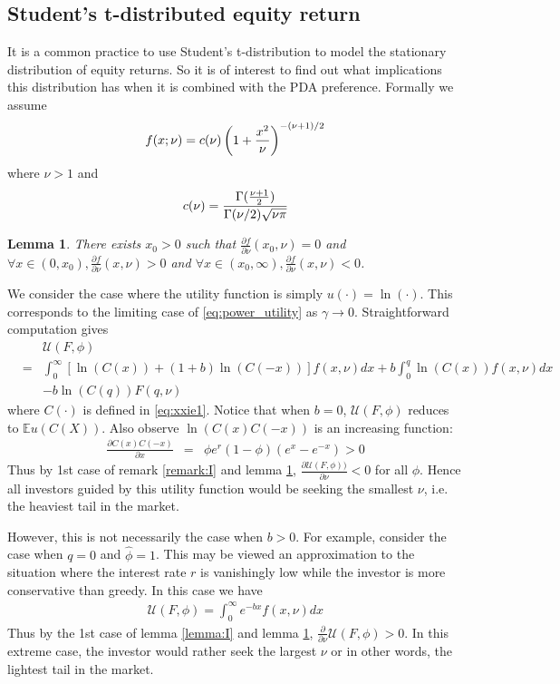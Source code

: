\documentclass{article}
\newcommand{\pd}[2]{
  \frac{\partial #1}{\partial #2}
}
\newcommand{\opd}[1]{
  \frac{\partial}{\partial #1}
}
\newcommand{\E}{
  \mathbb{E}
}
\newcommand{\1}[1]{
  \mathbf{1}_{\{#1\}}
}
\newtheorem{lemma}{Lemma}
\begin{document}
\subsection{Student's t-distributed equity return}
It is a common practice to use Student's t-distribution to model the
stationary distribution of equity returns. So it is of interest to
find out what implications this distribution has when it is combined
with the PDA preference. Formally we assume
\[
f(x; \nu) = c(\nu) \left(
  1 + {x^2 \over \nu}
\right)^{-(\nu + 1)/2}
\]
where $\nu > 1$ and
\[
c(\nu) = {
  \Gamma({\nu + 1 \over 2})
  \over
  \Gamma(\nu/2) \sqrt{\nu \pi}
}
\]
\begin{lemma}
  \label{lemma:II}
  There exists $x_0 > 0$ such that $\pd{f}{\nu}(x_0, \nu) = 0$ and
  $\forall x \in (0, x_0), \pd{f}{\nu}(x, \nu) > 0$ and
  $\forall x \in (x_0, \infty), \pd{f}{\nu}(x, \nu) < 0$.
\end{lemma}

We consider the case where the utility function is simply
$u(\cdot) = \ln(\cdot)$. This corresponds to the limiting case of
\eqref{eq:power_utility} as $\gamma \to 0$. Straightforward
computation gives
\begin{eqnarray*}
  && \mathcal U(F, \phi) \\
  &=&
  \int_{0}^{\infty}
  \left[
    \ln(C(x)) + (1 + b)\ln(C(-x))
  \right]
  f(x, \nu) dx
  + b \int_{0}^{q}
  \ln(C(x))
  f(x, \nu) dx \\
  &&
  - b \ln(C(q)) F(q, \nu)
\end{eqnarray*}
where $C(\cdot)$ is defined in \eqref{eq:xxie1}. Notice that
when $b = 0$, $\mathcal U(F, \phi)$  reduces to $\E u(C(X))$.
Also observe $\ln(C(x)C(-x))$ is an increasing function:
\begin{eqnarray*}
  \pd{C(x) C(-x)}{x}
  &=&
  \phi e^r (1 - \phi) (e^x - e^{-x}) > 0
\end{eqnarray*}
Thus by 1st case of remark \ref{remark:I} and lemma \ref{lemma:II},
$\pd{\mathcal U(F, \phi))}{\nu} < 0$ for all $\phi$. Hence all
investors guided by this utility function would be seeking the
smallest $\nu$, i.e. the heaviest tail in the market.

However, this is not necessarily the case when $b > 0$. For example,
consider the case when $q = 0$ and $\hat\phi = 1$. This may be
viewed an approximation to the situation where the interest rate $r$ is
vanishingly low while the investor is more conservative than
greedy. In this case we have
\begin{eqnarray*}
  \mathcal U(F, \phi) = \int_{0}^{\infty} e^{-b x} f(x, \nu) dx
\end{eqnarray*}
Thus by the 1st case of lemma \ref{lemma:I} and lemma \ref{lemma:II},
$\opd{\nu}\mathcal U(F, \phi) > 0$. In this extreme case, the investor
would rather seek the largest $\nu$ or in other words, the lightest
tail in the market.
\end{document}
